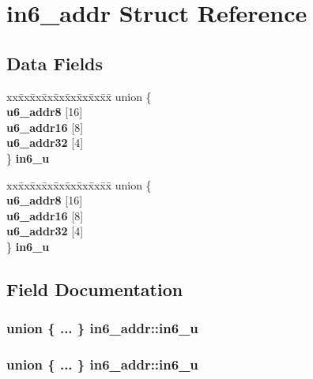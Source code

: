 \section{in6\_\-addr Struct Reference}
\label{structin6__addr}
\subsection*{Data Fields}
\begin{DoxyCompactItemize}
\item 
\begin{tabbing}
xx\=xx\=xx\=xx\=xx\=xx\=xx\=xx\=xx\=\kill
union \{\\
 {\bf u6\_addr8} [16]\\
 {\bf u6\_addr16} [8]\\
 {\bf u6\_addr32} [4]\\
\} {\bf in6\_u}\\

\end{tabbing}\item 
\begin{tabbing}
xx\=xx\=xx\=xx\=xx\=xx\=xx\=xx\=xx\=\kill
union \{\\
 {\bf u6\_addr8} [16]\\
 {\bf u6\_addr16} [8]\\
 {\bf u6\_addr32} [4]\\
\} {\bf in6\_u}\\

\end{tabbing}\end{DoxyCompactItemize}


\subsection{Field Documentation}
\subsubsection[{in6\_\-u}]{\setlength{\rightskip}{0pt plus 5cm}union \{ ... \}   {\bf in6\_\-addr::in6\_\-u}}\label{structin6__addr_a7555634901db2ed97be0e9b3378fe515}
\subsubsection[{in6\_\-u}]{\setlength{\rightskip}{0pt plus 5cm}union \{ ... \}   {\bf in6\_\-addr::in6\_\-u}}\label{structin6__addr_acd83d98817080878fa85b16a23700f68}
